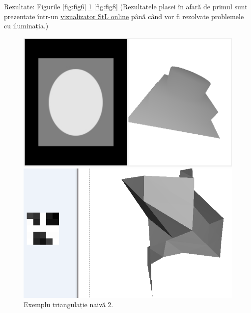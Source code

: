 \documentclass[12pt]{article}
\begin{document}
Rezultate: Figurile \ref{fig:fig6} \ref{fig:fig7}  \ref{fig:fig8} (Rezultatele plasei în afară de primul sunt prezentate într-un \href{https://www.viewstl.com/}{vizualizator StL online} până când vor fi rezolvate problemele cu iluminația.)

\begin{figure}[!htb]
	\begin{minipage}{0.48\textwidth}
		\centering
		\includegraphics[width=.7\linewidth]{ExempluNaiva1.png}
		\caption{Exemplu triangulație naivă 1.}\label{fig:fig6}
	\end{minipage}
	\begin{minipage}{0.48\textwidth}
		\centering
		\includegraphics[width=.7\linewidth]{ExempluNaiva2.png}
		\caption{Exemplu triangulație naivă 2.}\label{fig:fig7}
	\end{minipage}\hfill
\end{figure}
\end{document}
